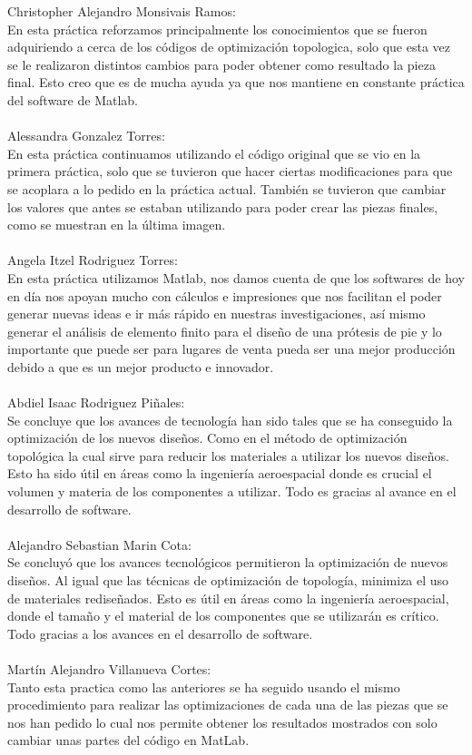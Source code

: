 \documentclass{article}
\begin{document}
Christopher Alejandro Monsivais Ramos: 
\\En esta práctica reforzamos principalmente los conocimientos que se fueron adquiriendo a cerca de los códigos de optimización topologica, solo que esta vez se le realizaron distintos cambios para poder obtener como resultado la pieza final. Esto creo que es de mucha ayuda ya que nos mantiene en constante práctica del software de Matlab.
\\
\\
Alessandra Gonzalez Torres: 
\\En esta práctica continuamos utilizando el código original que se vio en la primera práctica, solo que se tuvieron que hacer ciertas modificaciones para que se acoplara a lo pedido en la práctica actual. También se tuvieron que cambiar los valores que antes se estaban utilizando para poder crear las piezas finales, como se muestran en la última imagen. 
\\
\\
Angela Itzel Rodriguez Torres: 
\\En esta práctica utilizamos Matlab, nos damos cuenta de que los softwares de hoy en día nos apoyan mucho con cálculos e impresiones que nos facilitan el poder generar nuevas ideas e ir más rápido en nuestras investigaciones, así mismo generar el análisis de elemento finito para el diseño de una prótesis de pie y lo importante que puede ser para lugares de venta pueda ser una mejor producción debido a que es un mejor producto e innovador.
\\
\\
Abdiel Isaac Rodriguez Piñales: 
\\Se concluye que los avances de tecnología han sido tales que se ha conseguido la optimización de los nuevos diseños. Como en el método de optimización topológica la cual sirve para reducir los materiales a utilizar los nuevos diseños. Esto ha sido útil en áreas como la ingeniería aeroespacial donde es crucial el volumen y materia de los componentes a utilizar. Todo es gracias al avance en el desarrollo de software. 
\\
\\
Alejandro Sebastian Marin Cota: 
\\Se concluyó que los avances tecnológicos permitieron la optimización de nuevos diseños. Al igual que las técnicas de optimización de topología, minimiza el uso de materiales rediseñados. Esto es útil en áreas como la ingeniería aeroespacial, donde el tamaño y el material de los componentes que se utilizarán es crítico. Todo gracias a los avances en el desarrollo de software.
\\
\\
Mart\'{i}n Alejandro Villanueva Cortes:
\\Tanto esta practica como las anteriores se ha seguido usando el mismo procedimiento para realizar las optimizaciones de cada una de las piezas que se nos han pedido lo cual nos permite obtener los resultados mostrados con solo cambiar unas partes del código en MatLab.



\end{document}
